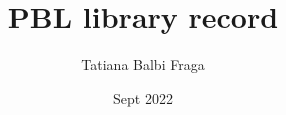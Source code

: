 \documentclass{article}
\title{PBL library record}
\author{Tatiana Balbi Fraga}
\date{Sept 2022}
\begin{document}
\maketitle

\newenvironment{mcsection}[1]
    {%
        \textbf{#1}

        \begin{itemize}[leftmargin=*,topsep=0pt,itemsep=-1ex,partopsep=1ex,parsep=1ex,after=\vspace{\medskipamount}]
    }
    {%
        \end{itemize}
    }
\end{document}
